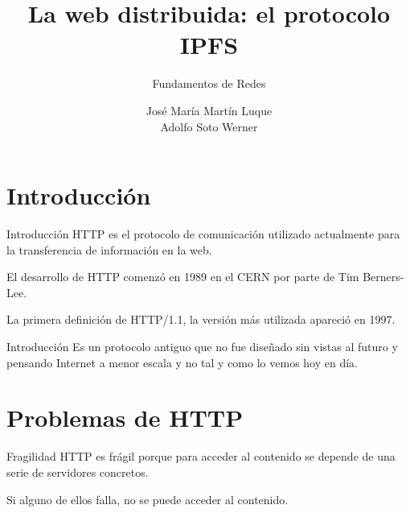 \documentclass[spanish]{beamer}
\title{La web distribuida: el protocolo IPFS}
\subtitle{Fundamentos de Redes}
\author{José María Martín Luque\\ Adolfo Soto Werner}
\begin{document}
\maketitle

\section{Introducción} %
\label{sec:introducción}

\begin{frame}{Introducción}    
  HTTP es el protocolo de comunicación utilizado actualmente para la transferencia de información en la web.

  El desarrollo de HTTP comenzó en 1989 en el CERN por parte de Tim Berners-Lee.

  La primera definición de HTTP/1.1, la versión más utilizada apareció en 1997.
\end{frame}

\begin{frame}{Introducción}
  Es un protocolo antiguo que no fue diseñado sin vistas al futuro y pensando Internet a menor escala y no tal y como lo vemos hoy en día.
\end{frame}


\section{Problemas de HTTP} %
\label{sec:problemas_de_http}

{
\begin{frame}[plain]
\end{frame}
}

\begin{frame}{Fragilidad}   
  HTTP es frágil porque para acceder al contenido se depende de una serie de servidores concretos.

  Si alguno de ellos falla, no se puede acceder al contenido.
\end{frame}
\end{document}
